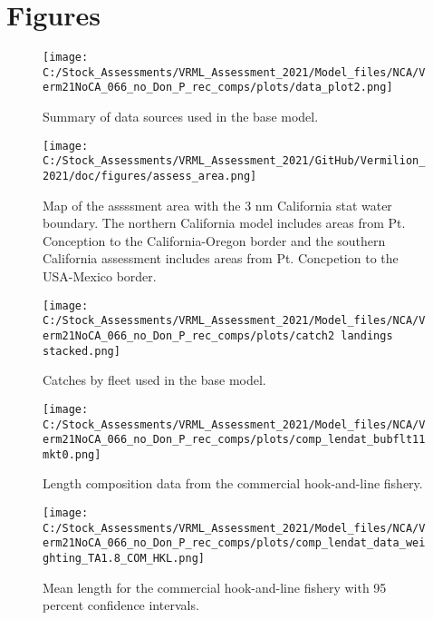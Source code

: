 \documentclass[11pt,
  english,
  a4paper,
]{article}
\begin{document}
\clearpage


\hypertarget{figures}{%
\section{Figures}\label{figures}}

\leavevmode\tagmcend\tagstructend

\begin{figure}
\centering
\texttt{[image: C:/Stock\_Assessments/VRML\_Assessment\_2021/Model\_files/NCA/Verm21NoCA\_066\_no\_Don\_P\_rec\_comps/plots/data\_plot2.png]}
\caption{Summary of data sources used in the base model.\label{fig:data-plot}}
\end{figure}

\begin{figure}
\centering
\texttt{[image: C:/Stock\_Assessments/VRML\_Assessment\_2021/GitHub/Vermilion\_2021/doc/figures/assess\_area.png]}
\caption{Map of the assssment area with the 3 nm California stat water boundary. The northern California model includes areas from Pt. Conception to the California-Oregon border and the southern California assessment includes areas from Pt. Concpetion to the USA-Mexico border.\label{fig:assess-area}}
\end{figure}

\begin{figure}
\centering
\texttt{[image: C:/Stock\_Assessments/VRML\_Assessment\_2021/Model\_files/NCA/Verm21NoCA\_066\_no\_Don\_P\_rec\_comps/plots/catch2 landings stacked.png]}
\caption{Catches by fleet used in the base model.\label{fig:catch}}
\end{figure}

\begin{figure}
\centering
\texttt{[image: C:/Stock\_Assessments/VRML\_Assessment\_2021/Model\_files/NCA/Verm21NoCA\_066\_no\_Don\_P\_rec\_comps/plots/comp\_lendat\_bubflt11mkt0.png]}
\caption{Length composition data from the commercial hook-and-line fishery.\label{fig:len-data-COM-HKL}}
\end{figure}

\begin{figure}
\centering
\texttt{[image: C:/Stock\_Assessments/VRML\_Assessment\_2021/Model\_files/NCA/Verm21NoCA\_066\_no\_Don\_P\_rec\_comps/plots/comp\_lendat\_data\_weighting\_TA1.8\_COM\_HKL.png]}
\caption{Mean length for the commercial hook-and-line fishery with 95 percent confidence intervals.\label{fig:mean-com-len-data-COM-HKL}}
\end{figure}
\end{document}
